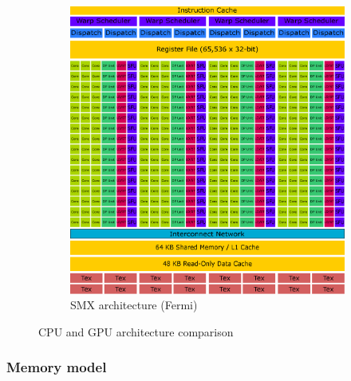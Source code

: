 \begin{figure}[p]
\begin{subfigure}{0.6\textwidth}
  \centering
  \includegraphics[width=0.9\linewidth]{img/SMXArchitecture.eps}
  \caption{SMX architecture (Fermi)}
  \label{fig:smxarchitecture}
\end{subfigure}
\caption{CPU and GPU architecture comparison}
\end{figure}

\subsubsection{Memory model}

